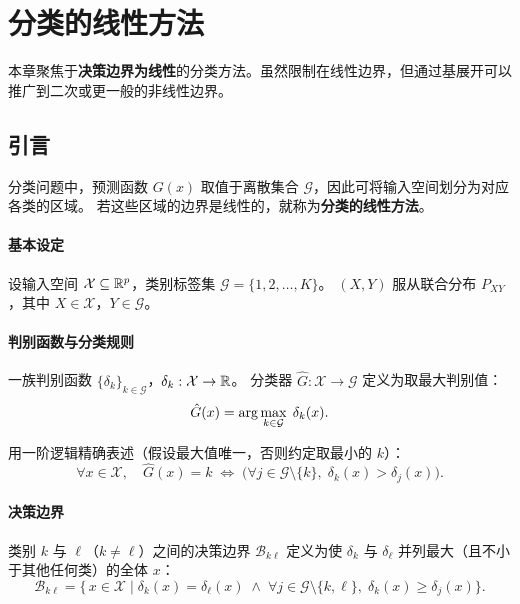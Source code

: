 \chapter{分类的线性方法}

本章聚焦于\textbf{决策边界为线性}的分类方法。虽然限制在线性边界，但通过基展开可以推广到二次或更一般的非线性边界。

\section{引言}

分类问题中，预测函数 $G(x)$ 取值于离散集合 $\mathcal{G}$，因此可将输入空间划分为对应各类的区域。
若这些区域的边界是线性的，就称为\textbf{分类的线性方法}。

\subsubsection{基本设定}

设输入空间 $\mathcal{X} \subseteq \mathbb{R}^p$，类别标签集 $\mathcal{G} = \{1, 2, \ldots, K\}$。
$(X, Y)$ 服从联合分布 $P_{XY}$，其中 $X \in \mathcal{X}$，$Y \in \mathcal{G}$。

\subsubsection{判别函数与分类规则}

一族判别函数 $\{\delta_k\}_{k \in \mathcal{G}}$，$\delta_k : \mathcal{X} \to \mathbb{R}$。
分类器 $\hat{G} : \mathcal{X} \to \mathcal{G}$ 定义为取最大判别值：
\begin{equation}\label{eq:discriminant_rule}
    \hat{G}(x) = \arg\max_{k \in \mathcal{G}} \; \delta_k(x).
\end{equation}

用一阶逻辑精确表述（假设最大值唯一，否则约定取最小的 $k$）：
\[
\forall x \in \mathcal{X}, \quad
\hat{G}(x) = k \;\Longleftrightarrow\;
\Big( \forall j \in \mathcal{G} \setminus \{k\},\; \delta_k(x) > \delta_j(x) \Big).
\]

\subsubsection{决策边界}

类别 $k$ 与 $\ell$（$k \neq \ell$）之间的决策边界 $\mathcal{B}_{k\ell}$ 定义为使 $\delta_k$ 与 $\delta_\ell$ 并列最大（且不小于其他任何类）的全体 $x$：
\begin{equation}\label{eq:decision_boundary}
    \mathcal{B}_{k\ell} = \Big\{\, x \in \mathcal{X} \;\Big|\;
    \delta_k(x) = \delta_\ell(x) \;\land\;
    \forall j \in \mathcal{G} \setminus \{k, \ell\},\; \delta_k(x) \geq \delta_j(x)
    \Big\}.
\end{equation}

